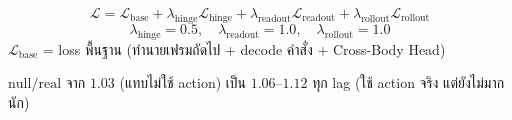 \documentclass[12pt,a4paper]{article}
\begin{document}
\vspace{5mm}
\[
\mathcal{L} = \mathcal{L}_{\text{base}} + \lambda_{\text{hinge}}\mathcal{L}_{\text{hinge}}
+ \lambda_{\text{readout}}\mathcal{L}_{\text{readout}} + \lambda_{\text{rollout}}\mathcal{L}_{\text{rollout}}
\]
\[
\lambda_{\text{hinge}}=0.5, \quad \lambda_{\text{readout}}=1.0, \quad \lambda_{\text{rollout}}=1.0
\]
\noindent $\mathcal{L}_{\text{base}}$ = loss พื้นฐาน (ทำนายเฟรมถัดไป + decode คำสั่ง + Cross-Body Head)

\vspace{4mm}
 $\mathrm{null}/\mathrm{real}$ จาก $1.03$ (แทบไม่ใช้ action) เป็น $1.06$--$1.12$ ทุก lag (ใช้ action จริง แต่ยังไม่มากนัก)
\end{document}
